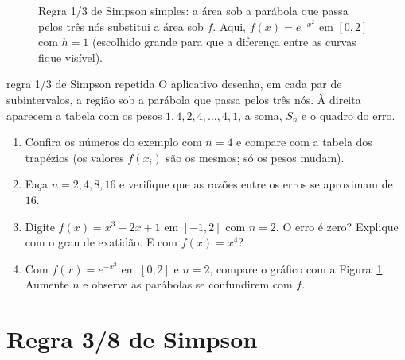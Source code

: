 \begin{figure}[h]
\centering
{}
\caption{Regra 1/3 de Simpson simples: a área sob a parábola que passa pelos três nós
substitui a área sob $f$. Aqui, $f(x)=e^{-x^2}$ em $[0,2]$ com $h=1$ (escolhido grande
para que a diferença entre as curvas fique visível).}
\label{fig:simpson}
\end{figure}

\begin{atividade}{regra 1/3 de Simpson repetida}{\arqSimpA}
O aplicativo desenha, em cada par de subintervalos, a região sob a parábola que passa pelos
três nós. À direita aparecem a tabela com os pesos $1,4,2,4,\dots,4,1$, a soma, $S_n$ e o
quadro do erro.
\begin{enumerate}[nosep]
  \item Confira os números do exemplo com $n=4$ e compare com a tabela dos trapézios (os
        valores $f(x_i)$ são os mesmos; só os pesos mudam).
  \item Faça $n=2,4,8,16$ e verifique que as razões entre os erros se aproximam de $16$.
  \item Digite $f(x)=x^3-2x+1$ em $[-1,2]$ com $n=2$. O erro é zero? Explique com o grau de
        exatidão. E com $f(x)=x^4$?
  \item Com $f(x)=e^{-x^2}$ em $[0,2]$ e $n=2$, compare o gráfico com a
        Figura~\ref{fig:simpson}. Aumente $n$ e observe as parábolas se confundirem com $f$.
\end{enumerate}
\end{atividade}

\section{Regra 3/8 de Simpson}

